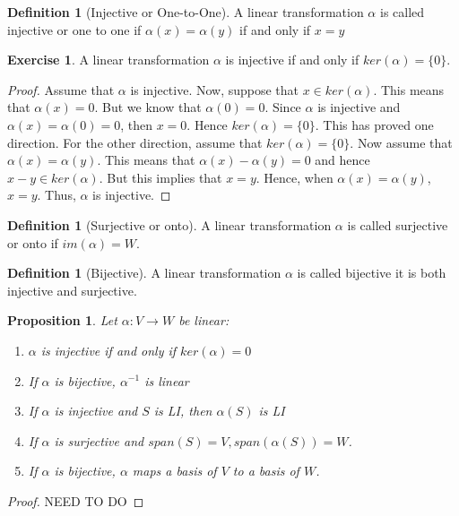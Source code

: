 \documentclass{tufte-handout}
\newtheorem{prop}[thm]{Proposition}
\theoremstyle{definition}
\newtheorem{defn}[thm]{Definition}
\newtheorem{exer}[thm]{Exercise}
\theoremstyle{remark}
\begin{document}
\begin{defn}[Injective or One-to-One]
A linear transformation $\alpha$ is called injective or one to one if $\alpha(x) = \alpha(y) $ if and only if $x=y$
\end{defn}
\begin{exer}
A linear transformation $\alpha$ is injective if and only if $ker(\alpha) = \{0\}$. 
\end{exer}
\begin{proof}
Assume that $\alpha$ is injective. Now, suppose that $x \in ker(\alpha)$. This means that $\alpha(x) = 0$. But we know that $\alpha(0) = 0$. Since $\alpha$ is injective and $\alpha(x) = \alpha(0) = 0$, then $x = 0$. Hence $ker(\alpha) = \{0\}$. This has proved one direction. For the other direction, assume that $ker(\alpha) = \{0\}$. Now assume that $\alpha(x) = \alpha(y)$. This means that $\alpha(x) - \alpha(y) = 0$ and hence $x- y \in ker(\alpha)$. But this implies that $x=y$. Hence, when $\alpha(x) = \alpha(y)$, $x=y$. Thus, $\alpha$ is injective. 
\end{proof}

\begin{defn}[Surjective or onto]
A linear transformation $\alpha$ is called surjective or onto if $im(\alpha) = W$.
\end{defn}

\begin{defn}[Bijective]
A linear transformation $\alpha$ is called bijective it is both injective and surjective.
\end{defn}

\begin{prop}
Let $\alpha: V \rightarrow W$ be linear:
\begin{enumerate}
\item $\alpha$ is injective if and only if $ker(\alpha) = 0$
\item If $\alpha$ is bijective, $\alpha^{-1}$ is linear
\item If $\alpha$ is injective and $S$ is LI, then $\alpha(S)$ is LI
\item If $\alpha$ is surjective and $span(S) = V, span(\alpha(S)) = W$. 
\item If $\alpha$ is bijective, $\alpha$ maps a basis of $V$ to a basis of $W$. 
\end{enumerate}
\end{prop}

\begin{proof}
    NEED TO DO
\end{proof}
\end{document}
